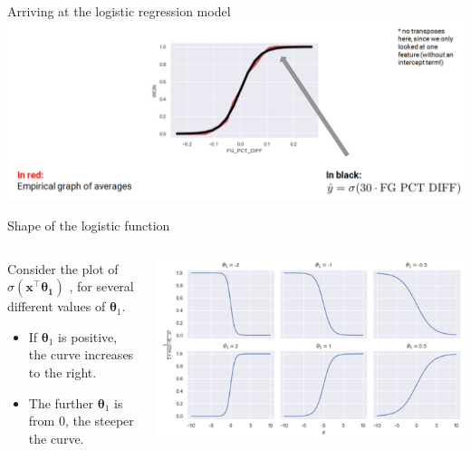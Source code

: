 \documentclass[aspectratio=169]{../latex_main/tntbeamer}  %
\begin{document}
	\begin{frame}{Arriving at the logistic regression model}
	    \includegraphics[scale=.4]{Bild6}
	\end{frame}
	
	\begin{frame}{Shape of the logistic function}
	   
	   \begin{columns}
	    
	   \begin{column}{.4\textwidth}
	   Consider the plot of       $\sigma (\bm{x}^\intercal\bm{\theta_1})$      , for several different values of $\bm\theta_1$. 
	   \begin{itemize}
	       \item If $\bm\theta_1$ is positive, the curve increases to the right.
	       \item The further  $\bm\theta_1$ is from 0, the steeper the curve.
	   \end{itemize}
	   \end{column}
	    
	    \begin{column}{.6\textwidth}

	            \centering	            \includegraphics[width=\textwidth]{Bild10}
	            
	    \end{column}
	    
	    \end{columns}
	\end{frame}
	
\end{document}
